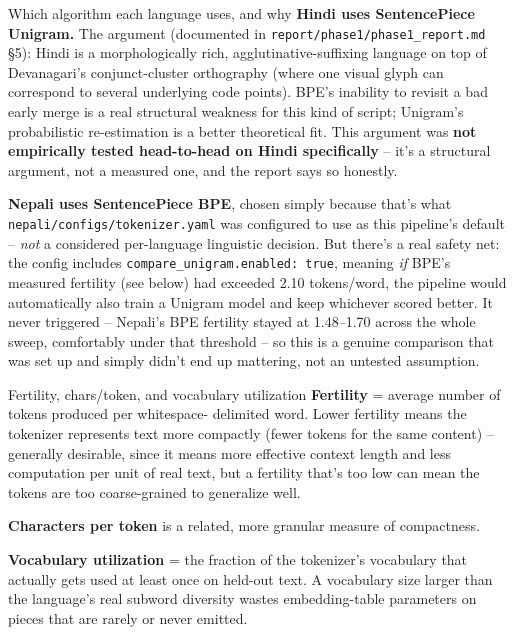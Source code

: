 \documentclass[11pt]{report}
\begin{document}
\begin{implementation}{Which algorithm each language uses, and why}
\textbf{Hindi uses SentencePiece Unigram.} The argument (documented in
\texttt{report/phase1/phase1\_report.md} \S5): Hindi is a
morphologically rich, agglutinative-suffixing language on top of
Devanagari's conjunct-cluster orthography (where one visual glyph can
correspond to several underlying code points). BPE's inability to revisit
a bad early merge is a real structural weakness for this kind of script;
Unigram's probabilistic re-estimation is a better theoretical fit. This
argument was \textbf{not empirically tested head-to-head on Hindi
specifically} -- it's a structural argument, not a measured one, and the
report says so honestly.

\textbf{Nepali uses SentencePiece BPE}, chosen simply because that's what
\texttt{nepali/configs/tokenizer.yaml} was configured to use as this
pipeline's default -- \textit{not} a considered per-language linguistic
decision. But there's a real safety net: the config includes
\texttt{compare\_unigram.enabled: true}, meaning \textit{if} BPE's
measured fertility (see below) had exceeded 2.10 tokens/word, the
pipeline would automatically also train a Unigram model and keep
whichever scored better. It never triggered -- Nepali's BPE fertility
stayed at 1.48--1.70 across the whole sweep, comfortably under that
threshold -- so this is a genuine comparison that was set up and simply
didn't end up mattering, not an untested assumption.
\end{implementation}

\begin{concept}{Fertility, chars/token, and vocabulary utilization}
\textbf{Fertility} = average number of tokens produced per whitespace-
delimited word. Lower fertility means the tokenizer represents text more
compactly (fewer tokens for the same content) -- generally desirable,
since it means more effective context length and less computation per
unit of real text, but a fertility that's too low can mean the tokens
are too coarse-grained to generalize well.

\textbf{Characters per token} is a related, more granular measure of
compactness.

\textbf{Vocabulary utilization} = the fraction of the tokenizer's
vocabulary that actually gets used at least once on held-out text. A
vocabulary size larger than the language's real subword diversity wastes
embedding-table parameters on pieces that are rarely or never emitted.
\end{concept}
\end{document}
